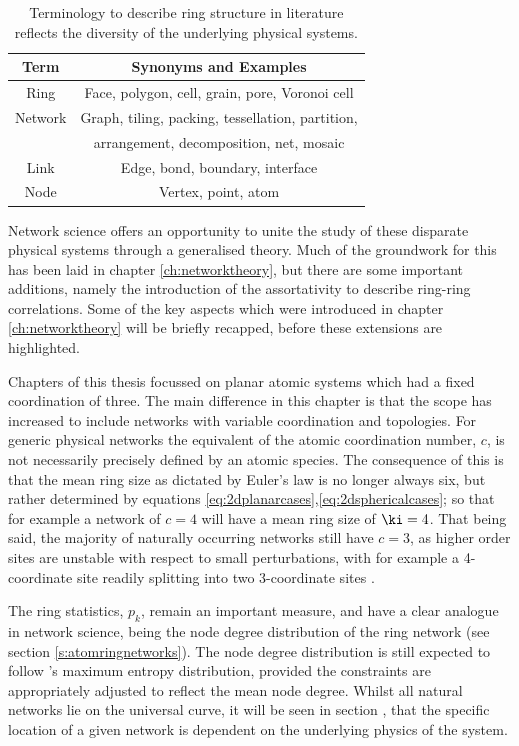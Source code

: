 \begin{table}[bt]
	\centering
     \caption{Terminology to describe ring structure in literature reflects the diversity of the underlying physical systems.}
     \label{tab:genterms}
     \begin{tabular}{cc}
     \toprule
     Term & Synonyms and Examples \\
     \midrule
     Ring & Face, polygon, cell, grain, pore, Voronoi cell\\
     Network & Graph, tiling, packing, tessellation, partition, \\
     & arrangement, decomposition, net, mosaic\\
     Link & Edge, bond, boundary, interface \\
     Node & Vertex, point, atom \\
     \bottomrule
     \end{tabular}
\end{table}
Network science offers an opportunity to unite the study of these disparate physical systems through a generalised theory.
Much of the groundwork for this has been laid in chapter \ref{ch:networktheory}, but there are some important additions, namely the introduction of the assortativity to describe ring\--ring correlations.
Some of the key aspects which were introduced in chapter \ref{ch:networktheory} will be briefly recapped, before these extensions are highlighted.

Chapters  of this thesis focussed on planar atomic systems which had a fixed coordination of three.
The main difference in this chapter is that the scope has increased to include networks with variable coordination and topologies.
For generic physical networks the equivalent of the atomic coordination number, $c$, is not necessarily precisely defined by an atomic species. 
The consequence of this is that the mean ring size as dictated by Euler's law is no longer always six, but rather determined by equations \eqref{eq:2dplanarcases},\eqref{eq:2dsphericalcases}; so that for example a network of $c=4$ will have a mean ring size of $\ki=4$.
That being said, the majority of naturally occurring networks still have $c=3$, as higher order sites are unstable with respect to small perturbations, with for example a 4\--coordinate site readily splitting into two 3\--coordinate sites \cite{Caer1993}.

The ring statistics, $p_k$, remain an important measure, and have a clear analogue in network science, being the node degree distribution of the ring network (see section \ref{s:atomringnetworks}).
The node degree distribution is still expected to follow \lm's maximum entropy distribution, provided the constraints are appropriately adjusted to reflect the mean node degree.
Whilst all natural networks lie on the universal \lm{} curve, it will be seen in section , that the specific location of a given network is dependent on the underlying physics of the system.

